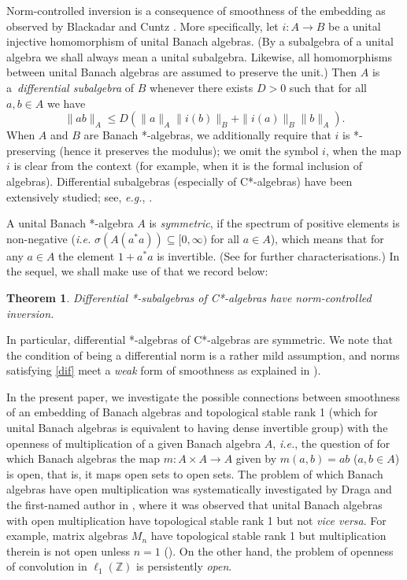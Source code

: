 \documentclass[12pt,fleqn]{amsart}
\newtheorem{theorem}{Theorem}[section]
\theoremstyle{definition}
\numberwithin{equation}{section}
\theoremstyle{remark}
\begin{document}
Norm-controlled inversion is a consequence of smoothness of the embedding as observed by Blackadar and Cuntz \cite{blackadar1991differential}. More specifically, let $i\colon A\to B$ be a unital injective homomorphism of unital Banach algebras. (By a subalgebra of a unital algebra we shall always mean a unital subalgebra. Likewise, all homomorphisms between unital Banach algebras are assumed to preserve the unit.) Then $A$ is a~\emph{differential subalgebra} of $B$ whenever there exists $D > 0$ such that for all $a,b\in A$ we have
%
\begin{equation}\label{dif}
    \|ab\|_A \leqslant D(\|a\|_A\|i(b)\|_B+\|i(a)\|_B\|b\|_A).
\end{equation}
%
When $A$ and $B$ are Banach *-algebras, we additionally require that $i$ is *-preserving (hence it preserves the modulus); we omit the symbol $i$, when the map $i$ is clear from the context (for example, when it is the formal inclusion of algebras). Differential subalgebras (especially of C*-algebras) have been extensively studied; see, \emph{e.g.}, \cite{kissin1994differential, grochenig2013norm, grochenig2014norm, samei2019norm}. \smallskip

A unital Banach *-algebra $A$ is \emph{symmetric}, if the spectrum of positive elements is non-negative (\emph{i.e.} $\sigma (A(a^{*}a)) \subseteq [0, \infty)$ for all $a \in A$), which means that for any $a\in A$ the element $1+a^*a$ is invertible. (See \cite[Chapter 6]{doran2018characterizations} for further characterisations.) %
In the sequel, we shall make use of \cite[Theorem 1.1(i)]{grochenig2013norm} that we record below:
%
\begin{theorem}\label{lem:diff}
    Differential *-subalgebras of C*-algebras have norm-controlled inversion.
\end{theorem}
%
In particular, differential *-algebras of C*-algebras are symmetric. We note that the condition of being a differential norm is a rather mild assumption, and norms satisfying \eqref{dif} meet a \textit{weak} form of smoothness as explained in \cite[Theorem 1.1(v)]{grochenig2013norm}).\bigskip

In the present paper, we investigate the possible connections between smoothness of an embedding of Banach algebras and topological stable rank 1 (which for unital Banach algebras is equivalent to having dense invertible group) with the openness of multiplication of a given Banach algebra $A$, \emph{i.e.}, the question of for which Banach algebras the map $m\colon A\times A\to A$ given by $m(a,b)=ab$ ($a, b\in A$) is open, that is, it maps open sets to open sets. The problem of which Banach algebras have open multiplication was systematically investigated by Draga and the first-named author in \cite{DraKa}, where it was observed that unital Banach algebras with open multiplication have topological stable rank 1 but not \emph{vice versa}. For example, matrix algebras $M_n$ have topological stable rank 1 but multiplication therein is not open unless $n=1$ (\cite{behrends2017matrix}). On the other hand, the problem of openness of convolution in $\ell_1(\mathbb Z)$ is persistently \emph{open}. 
\smallskip
\end{document}
